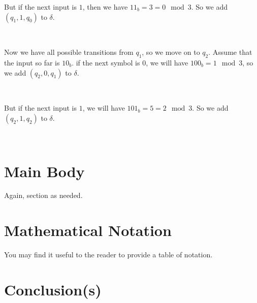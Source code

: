 \documentclass{bcthesis}
\newenvironment{exstep}[1]
		{
			\begin{minipage}{0.5 \textwidth}
				#1
			\end{minipage} \begin{minipage}{0.5 \paperwidth}
		}
		{
			\end{minipage}\\[0.5 em]
		}
\begin{document}
			\begin{exstep}
				{
					But if the next input is $1$, then we have $11_b = 3 = 0 \mod 3$.
					So we add $(q_1, 1, q_0)$ to $\delta$.
				}
				
			\end{exstep}
			

			\begin{exstep}
				{
				Now we have all possible transitions from $q_1$, so we move on to $q_2$.
				Assume that the input so far is $10_b$.
				if the next symbol is $0$, we will have $100_b = 1 \mod 3$, so we add $(q_2, 0, q_1)$ to $\delta$.
				}
				
			\end{exstep}
			
			\begin{exstep}
				{
					But if the next input is $1$, we will have $101_b = 5 = 2 \mod 3$.
					So we add $(q_2, 1, q_2)$ to $\delta$.
				}
				
			\end{exstep}


\chapter{Main Body}%
\label{sec:structured-writing}

Again, section as needed.

\chapter{Mathematical Notation}%
\label{sec:mathematical-notation}

You may find it useful to the reader to provide a table of notation. 

\chapter{Conclusion(s)}


\backmatter

\nocite{*}


\end{document}
